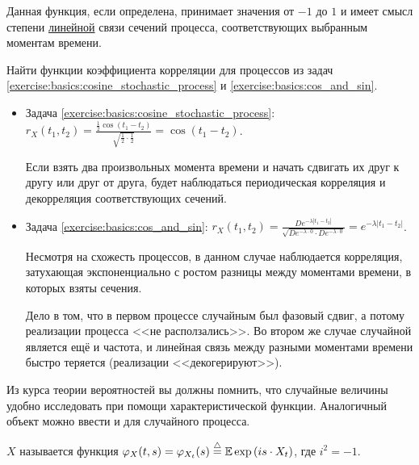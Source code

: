 Данная функция, если определена, принимает значения от $ -1 $ до $ 1 $
и имеет смысл степени \uline{линейной} связи сечений процесса,
соответствующих выбранным моментам времени.

\begin{exercise}
    \label{exercise:basics:correlation_coefficient_function}
    Найти функции коэффициента корреляции для процессов из задач \ref{exercise:basics:cosine_stochastic_process} и \ref{exercise:basics:cos_and_sin}.
\end{exercise}

\begin{solution}
    \noindent
    \begin{itemize}
        \item
            Задача \ref{exercise:basics:cosine_stochastic_process}:
            $
                \displaystyle
                r_X(t_1, t_2) = \frac{\frac{1}{2} \cos(t_1 - t_2)}{\sqrt{\frac{1}{2} \cdot \frac{1}{2}}} = \cos(t_1 - t_2)
            $.

            Если взять два произвольных момента времени и начать сдвигать их друг к другу или друг от друга,
            будет наблюдаться периодическая корреляция и декорреляция соответствующих сечений.
        \item
            Задача \ref{exercise:basics:cos_and_sin}:
            $
                \displaystyle
                r_X(t_1, t_2) = \frac{D e^{-\lambda |t_1 - t_2|}}{\sqrt{D e^{-\lambda \cdot 0} \cdot D e^{-\lambda \cdot 0}}} = e^{-\lambda |t_1 - t_2|}
            $.

            Несмотря на схожесть процессов, в данном случае наблюдается корреляция,
            затухающая экспоненциально с ростом разницы между моментами времени,
            в которых взяты сечения.

            Дело в том, что в первом процессе случайным был фазовый сдвиг, а потому реализации процесса <<не расползались>>.
            Во втором же случае случайной является ещё и частота, и линейная связь между разными моментами времени быстро теряется
            (реализации <<декогерируют>>).
    \end{itemize}
\end{solution}


Из курса теории вероятностей вы должны помнить,
что случайные величины удобно исследовать при помощи характеристической функции.
Аналогичный объект можно ввести и для случайного процесса.

\begin{definition}
    \label{definition:basics:characteristic_function}
     $ X $ называется функция $ \varphi_X(t, s) = \varphi_{X_t}(s) \overset{\triangle}{=} \operatorname{\mathbb{E}} \exp \left( i s \cdot X_t \right) $,
    где $ i^2 = -1 $.
\end{definition}
